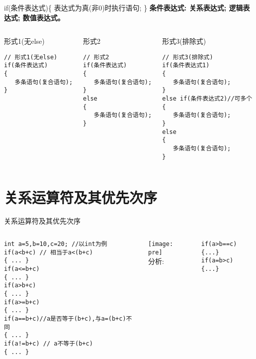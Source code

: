 \begin{frame}{if(条件表达式)\{ 表达式为真(非0)时执行语句; \}}
\textbf{条件表达式: 关系表达式; 逻辑表达式; 数值表达式。}
\begin{columns}[t]
\begin{beamerboxesrounded}{形式1(无else)}
\begin{lstlisting}
// 形式1(无else)
if(条件表达式)
{
   多条语句(复合语句);
}
\end{lstlisting}
\end{beamerboxesrounded}
\begin{beamerboxesrounded}{形式2}
\begin{lstlisting}
// 形式2
if(条件表达式)
{
   多条语句(复合语句);
}
else
{
   多条语句(复合语句);
}
\end{lstlisting} 
\end{beamerboxesrounded}
\begin{beamerboxesrounded}{形式3(排除式)}
\begin{lstlisting}
// 形式3(排除式)
if(条件表达式1)
{
   多条语句(复合语句);
}
else if(条件表达式2)//可多个
{
   多条语句(复合语句);
}
else
{
   多条语句(复合语句);
}
\end{lstlisting}
\end{beamerboxesrounded}
\end{columns}                        
\end{frame}

\section{关系运算符及其优先次序}

\begin{frame}{关系运算符及其优先次序}
\begin{columns}%
\begin{lstlisting}
int a=5,b=10,c=20; //以int为例
if(a<b+c) // 相当于a<(b+c)
{ ... }
if(a<=b+c) 
{ ... }
if(a>b+c) 
{ ... }
if(a>=b+c) 
{ ... }
if(a==b+c)//a是否等于(b+c),与a=(b+c)不同
{ ... }
if(a!=b+c) // a不等于(b+c)
{ ... }
\end{lstlisting}
\texttt{[image: pre]}\\
分析:
\begin{lstlisting}
if(a>b==c){...}
if(a=b>c) {...}
\end{lstlisting}
\end{columns}
\end{frame}

